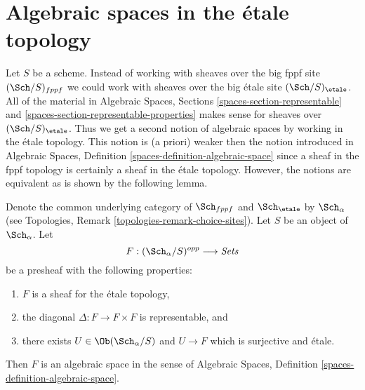 \section{Algebraic spaces in the \'etale topology}
\label{section-spaces-etale}

\noindent
Let $S$ be a scheme. Instead of working with sheaves over
the big fppf site $(\Sch/S)_{fppf}$ we could work with sheaves
over the big \'etale site $(\Sch/S)_\etale$. All of the material in
Algebraic Spaces, Sections \ref{spaces-section-representable} and
\ref{spaces-section-representable-properties}
makes sense for sheaves over $(\Sch/S)_\etale$.
Thus we get a second notion of algebraic spaces by working in the
\'etale topology. This notion is (a priori) weaker then the notion introduced
in Algebraic Spaces, Definition \ref{spaces-definition-algebraic-space}
since a sheaf in the fppf topology is certainly a sheaf in the \'etale
topology. However, the notions are equivalent as is shown by the following
lemma.

\begin{lemma}
\label{lemma-spaces-etale}
Denote the common underlying category of $\Sch_{fppf}$ and $\Sch_\etale$ by
$\Sch_\alpha$ (see Topologies, Remark \ref{topologies-remark-choice-sites}).
Let $S$ be an object of $\Sch_\alpha$. Let
$$
F : (\Sch_\alpha/S)^{opp} \longrightarrow \textit{Sets}
$$
be a presheaf with the following properties:
\begin{enumerate}
\item $F$ is a sheaf for the \'etale topology,
\item the diagonal $\Delta : F \to F \times F$ is representable, and
\item there exists $U \in \Ob(\Sch_\alpha/S)$
and $U \to F$ which is surjective and \'etale.
\end{enumerate}
Then $F$ is an algebraic space in the sense of
Algebraic Spaces, Definition \ref{spaces-definition-algebraic-space}.
\end{lemma}


